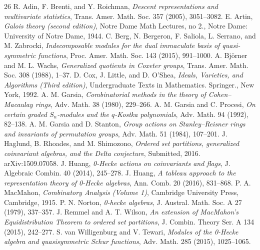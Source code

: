 \documentclass[10pt]{amsart}
\theoremstyle{definition}
\begin{document}
\begin{thebibliography}{26}
 R. Adin, F. Brenti, and Y. Roichman, \emph{Descent representations and multivariate statistics}, Trans. Amer. Math. Soc. 357 (2005), 3051--3082.
 E. Artin, \emph{Galois theory (second edition)}, Notre Dame Math Lectures, no 2., Notre Dame: University of Notre Dame, 1944.
 C. Berg, N. Bergeron, F. Saliola, L. Serrano, and M. Zabrocki, \emph{Indecomposable modules for the dual immaculate basis of quasi-symmetric functions}, Proc. Amer. Math. Soc. 143 (2015), 991--1000.
 A. Bj\"orner and M. L. Wachs, \emph{Generalized quotients in Coxeter groups}, Trans. Amer. Math. Soc. 308 (1988), 1--37.
 D. Cox, J. Little, and D. O'Shea, \emph{Ideals, Varieties, and Algorithms (Third edition)}, Undergraduate Texts in Mathematics. Springer., New York, 1992.
 A. M. Garsia, \emph{Combinatorial methods in the theory of Cohen--Macaulay rings}, Adv. Math. 38 (1980), 229--266.
 A. M. Garsia and C. Procesi, \emph{On certain graded $S_n$-modules and the $q$-Kostka polynomials}, Adv. Math. 94 (1992), 82--138.
 A. M. Garsia and D. Stanton, \emph{Group actions on Stanley--Reisner rings and invariants of permutation groups}, Adv. Math. 51 (1984), 107--201.
 J. Haglund, B. Rhoades, and M. Shimozono, \emph{Ordered set partitions, generalized coinvariant algebras, and the Delta conjecture}, Submitted, 2016. arXiv:1509.07058.
 J. Huang, \emph{0-Hecke actions on coinvariants and flags}, J. Algebraic Combin. 40 (2014), 245--278.
 J. Huang, \emph{A tableau approach to the representation theory of 0-Hecke algebras}, Ann. Comb. 20 (2016), 831--868.
 P. A. MacMahon, \emph{Combinatory Analysis (Volume 1)}, Cambridge University Press, Cambridge, 1915.
 P. N. Norton, \emph{0-hecke algebras}, J. Austral. Math. Soc. A 27 (1979), 337--357.
 J. Remmel and A. T. Wilson, \emph{An extension of MacMahon's Equidistribution Theorem to ordered set partitions}, J. Combin. Theory Ser. A 134 (2015), 242--277.
 S. van Willigenburg and V. Tewari, \emph{Modules of the 0-Hecke algebra and quasisymmetric Schur functions}, Adv. Math. 285 (2015), 1025--1065.
\end{thebibliography}
\end{document}
